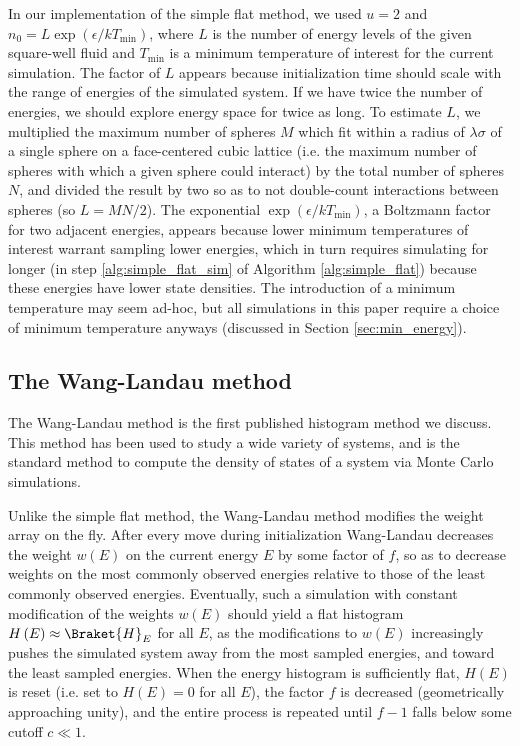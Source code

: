 \documentclass[11pt]{article}
\newcommand{\bk}{\Braket} %
\renewcommand{\t}{\text} %
\newcommand{\p}[1]{\left(#1\right)} %
\begin{document}
In our implementation of the simple flat method, we used $u=2$ and
$n_0=L\exp\p{\epsilon/kT_{\t{min}}}$, where $L$ is the number of
energy levels of the given square-well fluid and $T_{\t{min}}$ is a
minimum temperature of interest for the current simulation. The factor
of $L$ appears because initialization time should scale with the range
of energies of the simulated system. If we have twice the number of
energies, we should explore energy space for twice as long. To
estimate $L$, we multiplied the maximum number of spheres $M$ which
fit within a radius of $\lambda\sigma$ of a single sphere on a
face-centered cubic lattice (i.e. the maximum number of spheres with
which a given sphere could interact) by the total number of spheres
$N$, and divided the result by two so as to not double-count
interactions between spheres (so $L=MN/2$). The exponential
$\exp\p{\epsilon/kT_{\t{min}}}$, a Boltzmann factor for two adjacent
energies, appears because lower minimum temperatures of interest
warrant sampling lower energies, which in turn requires simulating for
longer (in step \ref{alg:simple_flat_sim} of Algorithm
\ref{alg:simple_flat}) because these energies have lower state
densities. The introduction of a minimum temperature may seem ad-hoc,
but all simulations in this paper require a choice of minimum
temperature anyways (discussed in Section \ref{sec:min_energy}).

\subsection{The Wang-Landau method}
\label{sec:wang_landau}

The Wang-Landau method is the first published histogram method we
discuss\cite{wang2001determining, belardinelli2007fast,
  zhou2005understanding, landau2004new}. This method has been used to
study a wide variety of systems, and is the standard method to compute
the density of states of a system via Monte Carlo
simulations\cite{landau2004new, yamaguchi2001three,
  parsons2006globule, parsons2006off}.

Unlike the simple flat method, the Wang-Landau method modifies the
weight array on the fly. After every move during initialization
Wang-Landau decreases the weight $w\p{E}$ on the current energy $E$ by
some factor of $f$, so as to decrease weights on the most commonly
observed energies relative to those of the least commonly observed
energies. Eventually, such a simulation with constant modification of
the weights $w\p{E}$ should yield a flat histogram
$H\p{E}\approx\bk{H}_E$ for all $E$, as the modifications to $w\p{E}$
increasingly pushes the simulated system away from the most sampled
energies, and toward the least sampled energies. When the energy
histogram is sufficiently flat, $H\p{E}$ is reset (i.e. set to
$H\p{E}=0$ for all $E$), the factor $f$ is decreased (geometrically
approaching unity), and the entire process is repeated until $f-1$
falls below some cutoff $c\ll 1$.
\end{document}
